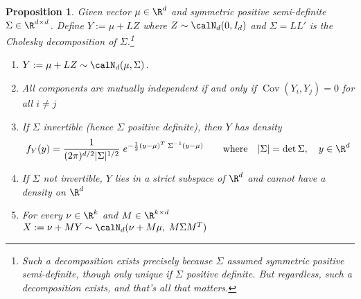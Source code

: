 \documentclass[12pt]{article}
\theoremstyle{plain}
\newtheorem{prop}[thm]{Proposition}
\theoremstyle{definition}
\theoremstyle{remark}
\newcommand{\Cov}{\operatorname{Cov}}
\begin{document}
\begin{prop}
Given vector $\mu\in\R^d$ and symmetric positive semi-definite
$\Sigma\in\R^{d\times d}$.
Define $Y:=\mu+LZ$ where $Z\sim\calN_d(0,I_d)$ and
$\Sigma=LL'$ is the Cholesky decomposition of $\Sigma$.\footnote{%
  Such a decomposition exists precisely because $\Sigma$ assumed
  symmetric positive semi-definite, though only unique if $\Sigma$
  positive definite. But regardless, such a decomposition exists, and
  that's all that matters.
}
\begin{enumerate}[label=\emph{(\roman*)}]
  \item $Y:=\mu+LZ\sim\calN_d(\mu,\Sigma)$.
  \item All components are mutually independent if and only if
    $\Cov(Y_i,Y_j)=0$ for all $i\neq j$
  \item If $\Sigma$ invertible (hence $\Sigma$ positive definite), then
    $Y$ has density
    \begin{equation}
      \label{pdf2}
      f_{Y}(y) =
      \frac{1}{(2\pi)^{d/2}\lvert \Sigma \rvert^{1/2}}
      \; e^{%
            -\frac{1}{2} (y-\mu)^T \; \Sigma^{-1} (y-\mu)
      }
      \qquad\text{where}\quad
      \lvert\Sigma\rvert = \det\Sigma,\quad y\in\R^d
    \end{equation}
  \item If $\Sigma$ not invertible, $Y$ lies in a strict subspace
    of $\R^d$ and cannot have a density on $\R^d$
  \item
    For every $\nu\in\R^k$ and $M\in\R^{k\times d}$
    $X:=\nu + MY \sim \calN_d(\nu + M\mu,\; M\Sigma M^T)$
\end{enumerate}
\end{prop}
\end{document}
